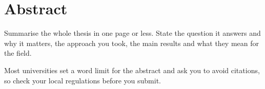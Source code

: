 \chapter*{Abstract}

Summarise the whole thesis in one page or less. State the question it
answers and why it matters, the approach you took, the main results and
what they mean for the field.

Most universities set a word limit for the abstract and ask you to avoid
citations, so check your local regulations before you submit.
